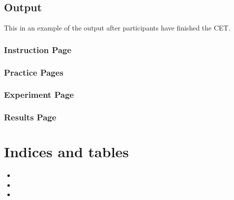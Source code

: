 \documentclass[letterpaper,10pt,english]{sphinxmanual}
\begin{document}
\section{Output}
\label{\detokenize{output:output}}\label{\detokenize{output:output-ref}}\label{\detokenize{output::doc}}
This in an example of the output after participants have finished the CET.


\subsection{Instruction Page}
\label{\detokenize{output:instruction-page}}

\subsection{Practice Pages}
\label{\detokenize{output:practice-pages}}

\subsection{Experiment Page}
\label{\detokenize{output:experiment-page}}

\subsection{Results Page}
\label{\detokenize{output:results-page}}

\chapter{Indices and tables}
\label{\detokenize{index:indices-and-tables}}\begin{itemize}
\item {} 

\item {} 

\item {} 

\end{itemize}



\renewcommand{\indexname}{Index}
\printindex
\end{document}

